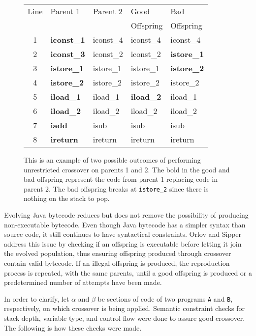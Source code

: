 \documentclass{sig-alternate}
\begin{document}
\begin{figure}
\begin{tabular}{|c|l|l|l|l|}

\hline
Line&Parent 1&Parent 2&Good&Bad\\  
 &         &         &Offspring&Offspring\\ \hline
1&\textbf{iconst\_1}&iconst\_4&iconst\_4&iconst\_4\\
2&\textbf{iconst\_3}&iconst\_2&iconst\_2&\textbf{istore\_1}\\
3&\textbf{istore\_1}&istore\_1&istore\_1&\textbf{istore\_2}\\
4&\textbf{istore\_2}&istore\_2&istore\_2&istore\_2\\
5&\textbf{iload\_1}&iload\_1&\textbf{iload\_2}&iload\_1\\
6&\textbf{iload\_2}&iload\_2&iload\_2&iload\_2\\
7&\textbf{iadd}&isub&isub&isub\\
8&\textbf{ireturn}&ireturn&ireturn&ireturn\\
\hline
\end{tabular}
\caption{This is an example of two possible outcomes of performing unrestricted crossover on parents 1 and 2. The bold in the good and bad offspring represent the code from parent 1 replacing code in parent 2. The bad offspring breaks at \texttt{istore\_2} since there is nothing on the stack to pop.}
\label{crossover}
  
\end{figure}

Evolving Java bytecode reduces but does not remove the possibility of producing non-executable bytecode. Even though Java bytecode has a simpler syntax than source code, it still continues to have syntactical constraints. Orlov and Sipper~\cite{FINCH2:2009} address this issue by checking if an offspring is executable before letting it join the evolved population, thus ensuring offspring produced through crossover contain valid bytecode. If an illegal offspring is produced, the reproduction process is repeated, with the same parents, until a good offspring is produced or a predetermined number of attempts have been made.\par

In order to clarify, let $\alpha$ and $\beta$ be sections of code of two programs \texttt{A} and \texttt{B}, respectively, on which crossover is being applied. Semantic constraint checks for stack depth, variable type, and control flow were done to assure good crossover. The following is how these checks were made.\par
\end{document}
